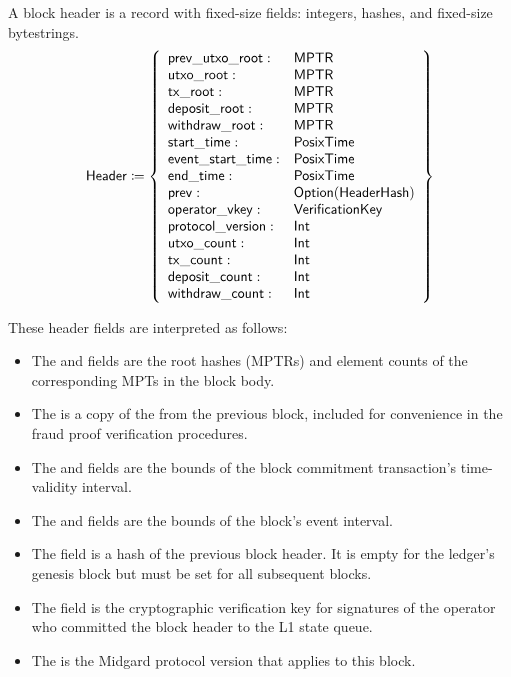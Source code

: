 \documentclass[../midgard.tex]{subfiles}
\begin{document}
A block header is a record with fixed-size fields: integers, hashes, and fixed-size bytestrings.
\begin{equation*}
    \mathsf{Header} \coloneq \left\{
    \begin{array}{ll}
        \mathsf{prev\_utxo\_root} : & \mathsf{MPTR} \\
        \mathsf{utxo\_root} : & \mathsf{MPTR} \\
        \mathsf{tx\_root} : & \mathsf{MPTR} \\
        \mathsf{deposit\_root} : & \mathsf{MPTR} \\
        \mathsf{withdraw\_root} : & \mathsf{MPTR} \\
        \mathsf{start\_time} : & \mathsf{PosixTime} \\
        \mathsf{event\_start\_time} : & \mathsf{PosixTime} \\
        \mathsf{end\_time} : & \mathsf{PosixTime} \\
        \mathsf{prev} : & \mathsf{Option(HeaderHash)} \\
        \mathsf{operator\_vkey} : & \mathsf{VerificationKey} \\
        \mathsf{protocol\_version} : & \mathsf{Int} \\
        \mathsf{utxo\_count} : & \mathsf{Int} \\
        \mathsf{tx\_count} : & \mathsf{Int} \\
        \mathsf{deposit\_count} : & \mathsf{Int} \\
        \mathsf{withdraw\_count} : & \mathsf{Int}
    \end{array} \right\}
\end{equation*}

These header fields are interpreted as follows:
\begin{itemize}
    \item The  and  fields are the root hashes (MPTRs) and element counts of the corresponding MPTs in the block body.
    \item The  is a copy of the  from the previous block, included for convenience in the fraud proof verification procedures.
    \item The  and  fields are the bounds of the block commitment transaction's time-validity interval.
    \item The  and  fields are the bounds of the block's event interval.
    \item The  field is a hash of the previous block header.
      It is empty for the ledger's genesis block but must be set for all subsequent blocks.
    \item The  field is the cryptographic verification key for signatures of the operator who committed the block header to the L1 state queue.
    \item The  is the Midgard protocol version that applies to this block.
\end{itemize}
\end{document}
